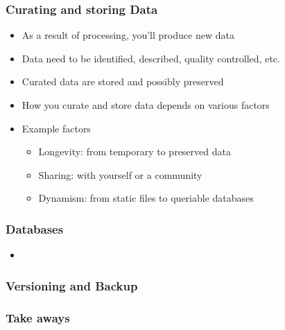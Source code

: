 \documentclass{beamer}
\begin{document}
\begin{frame}
  \frametitle{Curating and storing Data}
  
  \begin{itemize}
  \item As a result of processing, you'll produce new data
  \item Data need to be identified, described, quality controlled, etc.
  \item Curated data are stored and possibly preserved
  \item How you curate and store data depends on various factors
  \item Example factors
  \begin{itemize}
  \item Longevity: from temporary to preserved data
  \item Sharing: with yourself or a community
  \item Dynamism: from static files to queriable databases
  \end{itemize}
  \end{itemize}
\end{frame}

\begin{frame}
  \frametitle{Databases}
  
  \begin{itemize}
  \item
  \end{itemize}
\end{frame}

\begin{frame}
  \frametitle{Versioning and Backup}
\end{frame}

\begin{frame}
  \frametitle{Take aways}
  
\end{frame}
\end{document}
